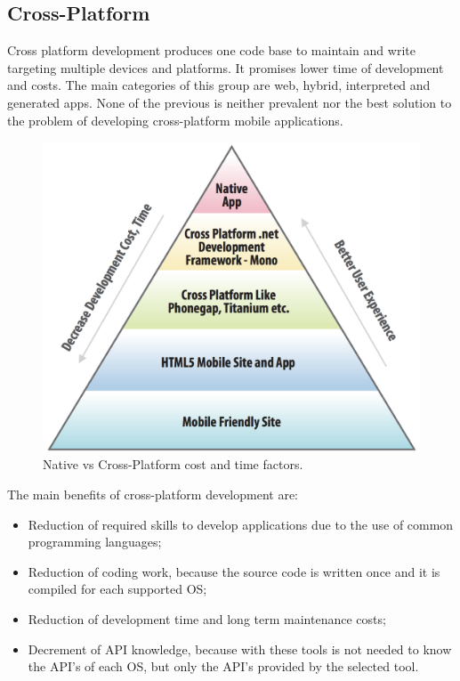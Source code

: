 \subsection{Cross-Platform}
Cross platform development produces one code base to maintain and write targeting multiple devices and platforms. It promises lower time of development and costs. The main categories of this group are web, hybrid, interpreted and generated apps. None of the previous is neither prevalent nor the best solution to the problem of developing cross-platform mobile applications.
\begin{figure}[ht!]
	\centering
	\includegraphics[width=120mm]{figures/ch6/3.png}
	\caption{Native vs Cross-Platform cost and time factors.\cite{ref9}}
	\label{fig6.3}
\end{figure}  
The main benefits of cross-platform development are:
\begin{itemize}
	\item Reduction of required skills to develop applications due to the use of common programming languages;
	\item Reduction of coding work, because the source code is written once and it is compiled for each supported OS;
	\item Reduction of development time and long term maintenance costs;
	\item Decrement of API knowledge, because with these tools is not needed to know the API’s of each OS, but only the API’s provided by the selected tool.\cite{ref10}
\end{itemize}

